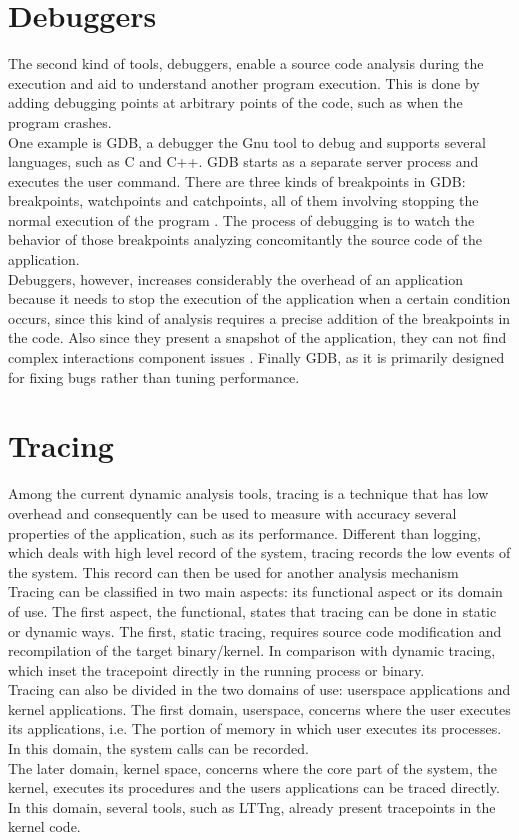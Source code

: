 \section{Debuggers}
The second kind of tools, debuggers, enable a source code analysis during the execution and aid to understand another program execution. This is done by adding debugging points at arbitrary points of the code, such as when the program crashes.\\
One example is GDB, a debugger the Gnu tool to debug and supports several languages, such as  C and C++. GDB starts as a separate server process and executes the user command. 
There are three kinds of breakpoints in GDB: breakpoints, watchpoints and catchpoints, all of them involving stopping the normal execution of the program \cite{gdb_breakpoint}. The process of debugging is to watch the behavior of those breakpoints analyzing concomitantly the source code of the application.\\
Debuggers, however, increases considerably the overhead of an application because it needs to stop the execution of the application when a certain condition occurs, since this kind of analysis requires a precise addition of the breakpoints in the code. Also since they present a snapshot of the application, they can not find complex interactions component issues \cite{multicore_system_debug}. Finally GDB, as it is primarily designed for fixing bugs rather than tuning performance. \\
\section{Tracing}
Among the current dynamic analysis tools, tracing is a technique that has low overhead and consequently can be used to measure with accuracy several properties of the application, such as its performance.  Different than logging, which deals with high level record of the system, tracing records the low events of the system. This record can then be used for another analysis mechanism\cite{desnoyer}\\
Tracing can be classified in two main aspects: its functional aspect or its domain of use. The first aspect, the functional, states that tracing can be done in static or dynamic ways. The first, static tracing, requires source code modification and recompilation of the target binary/kernel. In comparison with dynamic tracing, which inset the tracepoint directly in the running process or binary.\\
Tracing can also be divided in the two domains of use: userspace applications and kernel applications.
The first domain, userspace, concerns where the user executes its applications, i.e. The portion of memory in which user executes its processes. In this domain, the system calls can be recorded.\\
The later domain, kernel space, concerns where the core part of the system, the kernel, executes its procedures and the users applications can be traced directly. In this domain, several tools, such as LTTng, already present tracepoints in the kernel code.
